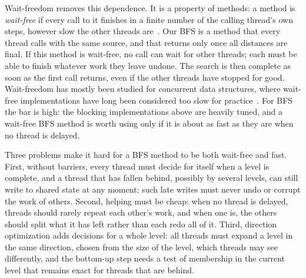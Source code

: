 Wait-freedom removes this dependence. It is a property of methods: a method is \emph{wait-free} if every call to it finishes in a finite number of the calling thread's own steps, however slow the other threads are~\cite{herlihy_waitfree, aomp}. Our BFS is a method that every thread calls with the same source, and that returns only once all distances are final. If this method is wait-free, no call can wait for other threads; each must be able to finish whatever work they leave undone. The search is then complete as soon as the first call returns, even if the other threads have stopped for good. Wait-freedom has mostly been studied for concurrent data structures, where wait-free implementations have long been considered too slow for practice~\cite{kogan_fastwf}. For BFS the bar is high: the blocking implementations above are heavily tuned, and a wait-free BFS method is worth using only if it is about as fast as they are when no thread is delayed.

Three problems make it hard for a BFS method to be both wait-free and fast. First, without barriers, every thread must decide for itself when a level is complete, and a thread that has fallen behind, possibly by several levels, can still write to shared state at any moment; such late writes must never undo or corrupt the work of others. Second, helping must be cheap: when no thread is delayed, threads should rarely repeat each other's work, and when one is, the others should split what it has left rather than each redo all of it. Third, direction optimization adds decisions for a whole level: all threads must expand a level in the same direction, chosen from the size of the level, which threads may see differently, and the bottom-up step needs a test of membership in the current level that remains exact for threads that are behind.

